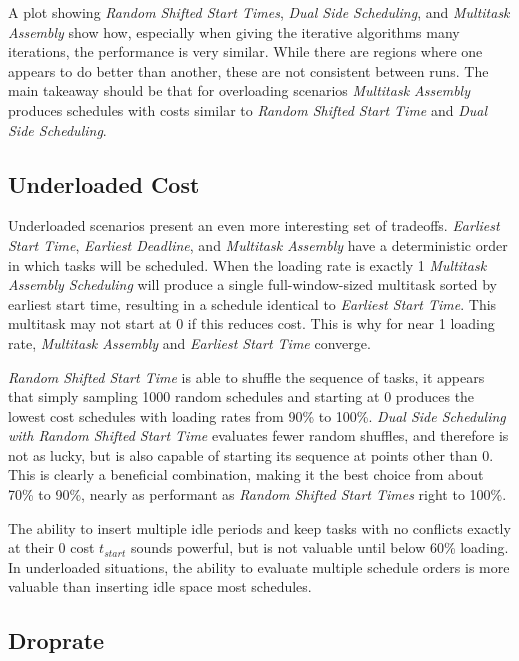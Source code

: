 \documentclass[journal,12pt,onecolumn,draftclsnofoot,]{IEEEtran}
\begin{document}
A plot showing \emph{Random Shifted Start Times}, \emph{Dual Side Scheduling}, and \emph{Multitask Assembly} show how, especially when giving the iterative algorithms many iterations, the performance is very similar.
While there are regions where one appears to do better than another, these are not consistent between runs.
The main takeaway should be that for overloading scenarios \emph{Multitask Assembly} produces schedules with costs similar to \emph{Random Shifted Start Time} and \emph{Dual Side Scheduling}.

\subsection{Underloaded Cost}

\begin{figure}[h]
	\centering
	{}
\end{figure}

Underloaded scenarios present an even more interesting set of tradeoffs.
\emph{Earliest Start Time}, \emph{Earliest Deadline}, and \emph{Multitask Assembly} have a deterministic order in which tasks will be scheduled.
When the loading rate is exactly 1 \emph{Multitask Assembly Scheduling} will produce a single full-window-sized multitask sorted by earliest start time, resulting in a schedule identical to \emph{Earliest Start Time}.
This multitask may not start at 0 if this reduces cost. This is why for near 1 loading rate, \emph{Multitask Assembly} and \emph{Earliest Start Time} converge.

\emph{Random Shifted Start Time} is able to shuffle the sequence of tasks, it appears that simply sampling 1000 random schedules and starting at 0 produces the lowest cost schedules with loading rates from 90\% to 100\%.
\emph{Dual Side Scheduling with Random Shifted Start Time} evaluates fewer random shuffles, and therefore is not as lucky, but is also capable of starting its sequence at points other than 0.
This is clearly a beneficial combination, making it the best choice from about 70\% to 90\%, nearly as performant as \emph{Random Shifted Start Times} right to 100\%.

The ability to insert multiple idle periods and keep tasks with no conflicts exactly at their 0 cost $t_{start}$ sounds powerful, but is not valuable until below 60\% loading.
In underloaded situations, the ability to evaluate multiple schedule orders is more valuable than inserting idle space most schedules.

\subsection{Droprate}
\end{document}
